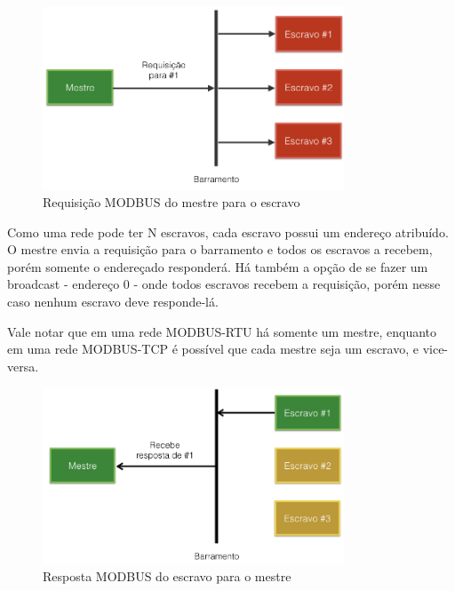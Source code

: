         \begin{figure}[H]
          \begin{center}
            \includegraphics[width=0.8\textwidth,natwidth=1024,natheight=768]{assets/images/modbus-req-1.png}
            \caption{Requisição MODBUS do mestre para o escravo}
            \label{fig:modbus-req-1}
          \end{center}
        \end{figure}

        Como uma rede pode ter N escravos, cada escravo possui um endereço atribuído. O mestre envia a requisição para o barramento e todos os escravos a recebem, porém somente o endereçado responderá. Há também a opção de se fazer um broadcast - endereço 0 - onde todos escravos recebem a requisição, porém nesse caso nenhum escravo deve responde-lá.

        Vale notar que em uma rede MODBUS-RTU há somente um mestre, enquanto em uma rede MODBUS-TCP é possível que cada mestre seja um escravo, e vice-versa.

        \begin{figure}[H]
          \begin{center}
            \includegraphics[width=0.8\textwidth,natwidth=1024,natheight=768]{assets/images/modbus-req-2.png}
            \caption{Resposta MODBUS do escravo para o mestre}
            \label{fig:modbus-req-2}
          \end{center}
        \end{figure}

